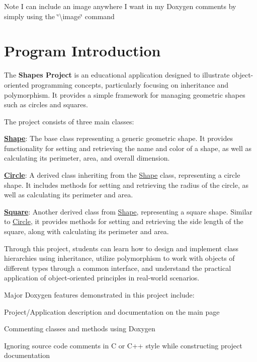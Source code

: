 \begin{DoxyNote}{Note}
I can include an image anywhere I want in my Doxygen comments by simply using the \char`\"{}\textbackslash{}image\char`\"{} command 
\end{DoxyNote}
\hypertarget{index_intro}{}\section{Program Introduction}\label{index_intro}
The {\bfseries{Shapes Project}} is an educational application designed to illustrate object-\/oriented programming concepts, particularly focusing on inheritance and polymorphism. It provides a simple framework for managing geometric shapes such as circles and squares.

The project consists of three main classes\+:
\begin{DoxyItemize}
\item {\bfseries{\mbox{\hyperlink{class_shape}{Shape}}}}\+: The base class representing a generic geometric shape. It provides functionality for setting and retrieving the name and color of a shape, as well as calculating its perimeter, area, and overall dimension.
\item {\bfseries{\mbox{\hyperlink{class_circle}{Circle}}}}\+: A derived class inheriting from the \mbox{\hyperlink{class_shape}{Shape}} class, representing a circle shape. It includes methods for setting and retrieving the radius of the circle, as well as calculating its perimeter and area.
\item {\bfseries{\mbox{\hyperlink{class_square}{Square}}}}\+: Another derived class from \mbox{\hyperlink{class_shape}{Shape}}, representing a square shape. Similar to \mbox{\hyperlink{class_circle}{Circle}}, it provides methods for setting and retrieving the side length of the square, along with calculating its perimeter and area.
\end{DoxyItemize}

Through this project, students can learn how to design and implement class hierarchies using inheritance, utilize polymorphism to work with objects of different types through a common interface, and understand the practical application of object-\/oriented principles in real-\/world scenarios.

Major Doxygen features demonstrated in this project include\+:


\begin{DoxyItemize}
\item Project/\+Application description and documentation on the main page
\item Commenting classes and methods using Doxygen
\item Ignoring source code comments in C or C++ style while constructing project documentation
\end{DoxyItemize}

